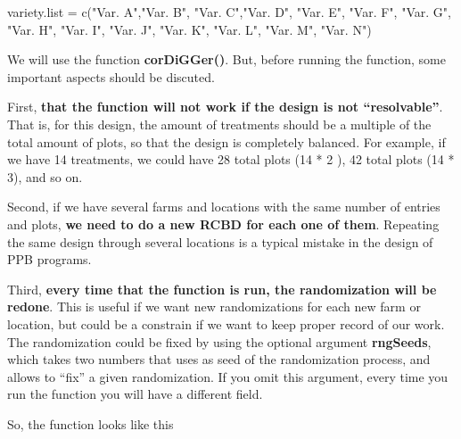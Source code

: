 \documentclass[
]{book}
\newenvironment{Shaded}{\begin{snugshade}}{\end{snugshade}}
\newcommand{\FunctionTok}[1]{\textcolor[rgb]{0.00,0.00,0.00}{#1}}
\newcommand{\NormalTok}[1]{#1}
\newcommand{\OtherTok}[1]{\textcolor[rgb]{0.56,0.35,0.01}{#1}}
\newcommand{\StringTok}[1]{\textcolor[rgb]{0.31,0.60,0.02}{#1}}
\begin{document}
\begin{Shaded}
\begin{Highlighting}[]
\NormalTok{variety.list }\OtherTok{=}  \FunctionTok{c}\NormalTok{(}\StringTok{"Var. A"}\NormalTok{,}\StringTok{"Var. B"}\NormalTok{, }\StringTok{"Var. C"}\NormalTok{,}\StringTok{"Var. D"}\NormalTok{,}
                  \StringTok{"Var. E"}\NormalTok{, }\StringTok{"Var. F"}\NormalTok{, }\StringTok{"Var. G"}\NormalTok{,  }\StringTok{"Var. H"}\NormalTok{,}
                  \StringTok{"Var. I"}\NormalTok{, }\StringTok{"Var. J"}\NormalTok{, }\StringTok{"Var. K"}\NormalTok{,  }\StringTok{"Var. L"}\NormalTok{,}
                  \StringTok{"Var. M"}\NormalTok{, }\StringTok{"Var. N"}\NormalTok{)}
\end{Highlighting}
\end{Shaded}

We will use the function \textbf{corDiGGer()}. But, before running the function, some important aspects should be discuted.

First, \textbf{that the function will not work if the design is not ``resolvable''}. That is, for this design, the amount of treatments should be a multiple of the total amount of plots, so that the design is completely balanced. For example, if we have 14 treatments, we could have 28 total plots (14 * 2 ), 42 total plots (14 * 3), and so on.

Second, if we have several farms and locations with the same number of entries and plots, \textbf{we need to do a new RCBD for each one of them}. Repeating the same design through several locations is a typical mistake in the design of PPB programs.

Third, \textbf{every time that the function is run, the randomization will be redone}. This is useful if we want new randomizations for each new farm or location, but could be a constrain if we want to keep proper record of our work. The randomization could be fixed by using the optional argument \textbf{rngSeeds}, which takes two numbers that uses as seed of the randomization process, and allows to ``fix'' a given randomization. If you omit this argument, every time you run the function you will have a different field.

So, the function looks like this
\end{document}
